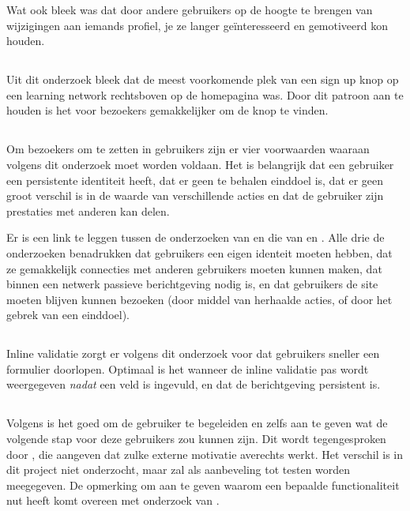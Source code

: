 \documentclass[a4paper, 10pt, pdftex]{report}
\begin{document}
        Wat ook bleek was dat door andere gebruikers op de hoogte te brengen van wijzigingen aan iemands profiel, je ze langer ge\"interesseerd en gemotiveerd kon houden.

      \subsection{\cite{Editorial2008}}
      Uit dit onderzoek bleek dat de meest voorkomende plek van een sign up knop op een learning network rechtsboven op de homepagina was. Door dit patroon aan te houden is het voor bezoekers gemakkelijker om de knop te vinden.

      \subsection{\cite{Sloep2009}}
      Om bezoekers om te zetten in gebruikers zijn er vier voorwaarden waaraan volgens dit onderzoek moet worden voldaan. Het is belangrijk dat een gebruiker een persistente identiteit heeft, dat er geen te behalen einddoel is, dat er geen groot verschil is in de waarde van verschillende acties en dat de gebruiker zijn prestaties met anderen kan delen.

      Er is een link te leggen tussen de onderzoeken van \citeauthor{Sloep2009} en die van \citeauthor{Brouns2008} en \citeauthor{Sohn2005}. Alle drie de onderzoeken benadrukken dat gebruikers een eigen identeit moeten hebben, dat ze gemakkelijk connecties met anderen gebruikers moeten kunnen maken, dat binnen een netwerk passieve berichtgeving nodig is, en dat gebruikers de site moeten blijven kunnen bezoeken (door middel van herhaalde acties, of door het gebrek van een einddoel).

      \subsection{\cite{Wroblewski2009}}
        Inline validatie zorgt er volgens dit onderzoek voor dat gebruikers sneller een formulier doorlopen. Optimaal is het wanneer de inline validatie pas wordt weergegeven \emph{nadat} een veld is ingevuld, en dat de berichtgeving persistent is.

      \subsection{\cite{Alfrink2008}}
        Volgens \citeauthor{Alfrink2008} is het goed om de gebruiker te begeleiden en zelfs aan te geven wat de volgende stap voor deze gebruikers zou kunnen zijn. Dit wordt tegengesproken door \cite{Beenen2004}, die aangeven dat zulke externe motivatie averechts werkt. Het verschil is in dit project niet onderzocht, maar zal als aanbeveling tot testen worden meegegeven. De opmerking om aan te geven waarom een bepaalde functionaliteit nut heeft komt overeen met onderzoek van \cite{Brouns2008}.
\end{document}
